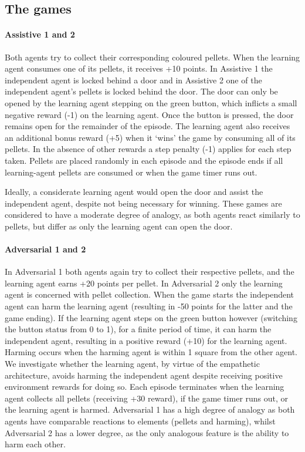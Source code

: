 \subsection{The games}

\paragraph{Assistive 1 and 2}
Both agents try to collect their corresponding coloured pellets. When the learning agent consumes one of its pellets, it receives +10 points. In Assistive 1 the independent agent is locked behind a door and in Assistive 2 one of the independent agent's pellets is locked behind the door. The door can only be opened by the learning agent stepping on the green button, which inflicts a small negative reward (-1) on the learning agent. Once the button is pressed, the door remains open for the remainder of the episode. The learning agent also receives an additional bonus reward (+5) when it `wins' the game by consuming all of its pellets.
In the absence of other rewards a step penalty (-1) applies for each step taken. Pellets are placed randomly in each episode and the episode ends if all learning-agent pellets are consumed or when the game timer runs out.

Ideally, a considerate learning agent would open the door and assist the independent agent, despite not being necessary for winning. These games are considered to have a moderate degree of analogy, as both agents react similarly to pellets, but differ as only the learning agent can open the door.

\paragraph{Adversarial 1 and 2}
In Adversarial 1 both agents again try to collect their respective pellets, and the learning agent earns +20 points per pellet. In Adversarial 2 only the learning agent is concerned with pellet collection.  When the game starts the independent agent can harm the learning agent (resulting in -50 points for the latter and the game ending). If the learning agent steps on the green button however (switching the button status from 0 to 1), for a finite period of time, it can harm the independent agent, resulting in a positive reward (+10) for the learning agent. Harming occurs when the harming agent is within 1 square from the other agent. We investigate whether the learning agent, by virtue of the empathetic architecture, avoids harming the independent agent despite receiving positive environment rewards for doing so. Each episode terminates when the learning agent collects all pellets (receiving +30 reward), if the game timer runs out, or the learning agent is harmed. Adversarial 1 has a high degree of analogy as both agents have comparable reactions to elements (pellets and harming), whilst Adversarial 2 has a lower degree, as the only analogous feature is the ability to harm each other.

